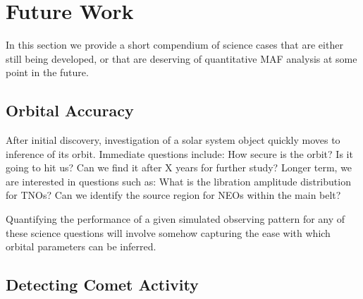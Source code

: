%
%

\section{Future Work}
\def\secname{\chpname:future}\label{sec:\secname}

In this section we provide a short compendium of science cases that
are either still being developed, or that are deserving of quantitative
MAF analysis at some point in the future.



\subsection{Orbital Accuracy}

After initial discovery, investigation of a solar system object quickly
moves to inference of its orbit. Immediate questions include: How secure
is the orbit? Is it going to hit us? Can we find it after X years for
further study? Longer term, we are interested in questions such as: What
is the libration amplitude distribution for TNOs? Can we identify the
source region for NEOs within the main belt?

Quantifying the performance of a given simulated observing pattern for
any of these  science questions will involve somehow capturing the ease
with which  orbital parameters can be inferred.



\subsection{Detecting Comet Activity}

